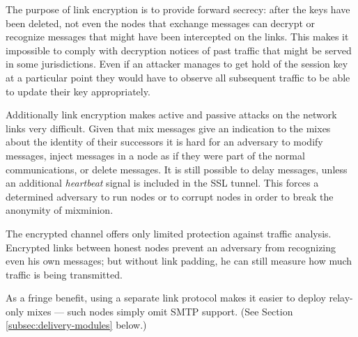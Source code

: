 \documentclass[11pt]{IEEEtran}
\begin{document}
%

The purpose of link encryption is to provide forward secrecy: 
after the keys have been deleted, not even the
nodes that exchange messages can decrypt or recognize messages
that might have been intercepted on the links. This makes it
impossible to comply with decryption notices of past traffic 
that might be served in
some jurisdictions.  
Even if an
attacker manages to get hold of the session key at a particular point
they would have to observe all subsequent traffic to be able to update
their key appropriately.

Additionally link encryption makes active and passive attacks on the
network links very difficult. Given that mix messages give an
indication to the mixes about the identity of their successors it is
hard for an 
adversary to modify messages, inject messages in a node as if they
were part of the normal communications, or delete messages. It is
still possible to delay messages, unless an additional
\emph{heartbeat} signal is included in the SSL tunnel. This forces a
determined adversary to run nodes or to corrupt nodes in 
order to break the anonymity of mixminion.

The encrypted channel offers only limited protection against traffic
analysis. Encrypted links between honest nodes prevent an adversary
from recognizing even his own messages; but without link padding, he
can still measure how much traffic is being transmitted.

As a fringe benefit, using a separate link protocol makes it
easier to deploy relay-only mixes --- such nodes simply omit SMTP
support.  (See Section \ref{subsec:delivery-modules} below.)
\end{document}
